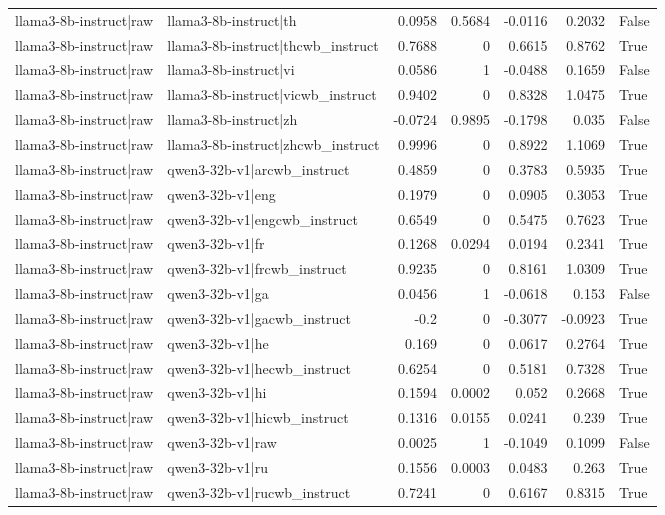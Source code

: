 \begin{table}
\begin{tabular}{l l r r r r l}
llama3-8b-instruct|raw & llama3-8b-instruct|th & 0.0958 & 0.5684 & -0.0116 & 0.2032 & False \\
llama3-8b-instruct|raw & llama3-8b-instruct|thcwb_instruct & 0.7688 & 0 & 0.6615 & 0.8762 & True \\
llama3-8b-instruct|raw & llama3-8b-instruct|vi & 0.0586 & 1 & -0.0488 & 0.1659 & False \\
llama3-8b-instruct|raw & llama3-8b-instruct|vicwb_instruct & 0.9402 & 0 & 0.8328 & 1.0475 & True \\
llama3-8b-instruct|raw & llama3-8b-instruct|zh & -0.0724 & 0.9895 & -0.1798 & 0.035 & False \\
llama3-8b-instruct|raw & llama3-8b-instruct|zhcwb_instruct & 0.9996 & 0 & 0.8922 & 1.1069 & True \\
llama3-8b-instruct|raw & qwen3-32b-v1|arcwb_instruct & 0.4859 & 0 & 0.3783 & 0.5935 & True \\
llama3-8b-instruct|raw & qwen3-32b-v1|eng & 0.1979 & 0 & 0.0905 & 0.3053 & True \\
llama3-8b-instruct|raw & qwen3-32b-v1|engcwb_instruct & 0.6549 & 0 & 0.5475 & 0.7623 & True \\
llama3-8b-instruct|raw & qwen3-32b-v1|fr & 0.1268 & 0.0294 & 0.0194 & 0.2341 & True \\
llama3-8b-instruct|raw & qwen3-32b-v1|frcwb_instruct & 0.9235 & 0 & 0.8161 & 1.0309 & True \\
llama3-8b-instruct|raw & qwen3-32b-v1|ga & 0.0456 & 1 & -0.0618 & 0.153 & False \\
llama3-8b-instruct|raw & qwen3-32b-v1|gacwb_instruct & -0.2 & 0 & -0.3077 & -0.0923 & True \\
llama3-8b-instruct|raw & qwen3-32b-v1|he & 0.169 & 0 & 0.0617 & 0.2764 & True \\
llama3-8b-instruct|raw & qwen3-32b-v1|hecwb_instruct & 0.6254 & 0 & 0.5181 & 0.7328 & True \\
llama3-8b-instruct|raw & qwen3-32b-v1|hi & 0.1594 & 0.0002 & 0.052 & 0.2668 & True \\
llama3-8b-instruct|raw & qwen3-32b-v1|hicwb_instruct & 0.1316 & 0.0155 & 0.0241 & 0.239 & True \\
llama3-8b-instruct|raw & qwen3-32b-v1|raw & 0.0025 & 1 & -0.1049 & 0.1099 & False \\
llama3-8b-instruct|raw & qwen3-32b-v1|ru & 0.1556 & 0.0003 & 0.0483 & 0.263 & True \\
llama3-8b-instruct|raw & qwen3-32b-v1|rucwb_instruct & 0.7241 & 0 & 0.6167 & 0.8315 & True \\

\end{tabular}
\end{table}
